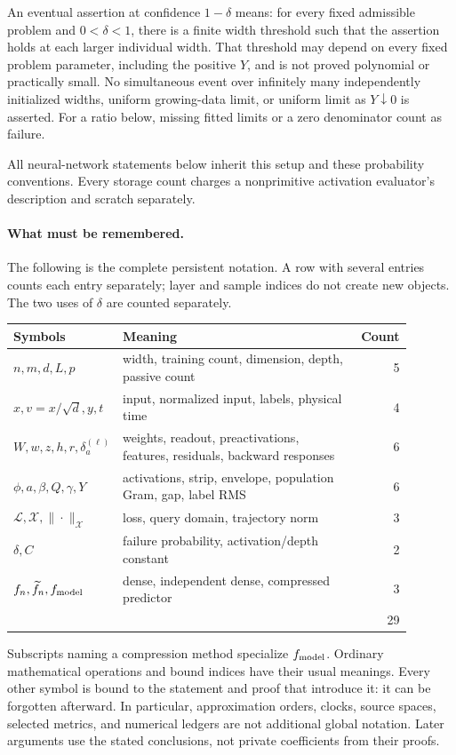 \documentclass[11pt]{article}
\theoremstyle{definition}
\theoremstyle{remark}
\newcommand{\cL}{\mathcal L}
\begin{document}
An eventual assertion at confidence $1-\delta$ means: for every fixed
admissible problem and $0<\delta<1$, there is a finite width threshold such
that the assertion holds at each larger individual width. That threshold
may depend on every fixed problem parameter, including the positive $Y$,
and is not proved polynomial or practically small. No simultaneous event
over infinitely many independently initialized widths, uniform growing-data
limit, or uniform limit as $Y\downarrow0$ is asserted. For a ratio below,
missing fitted limits or a zero denominator count as failure.

All neural-network statements below inherit this setup and these probability
conventions. Every storage count charges a nonprimitive activation evaluator's
description and scratch separately.

\paragraph{What must be remembered.}
The following is the complete persistent notation. A row with several entries
counts each entry separately; layer and sample indices do not create new
objects. The two uses of $\delta$ are counted separately.
\begin{center}\small
\begin{tabular}{@{}p{0.24\linewidth}p{0.65\linewidth}r@{}}
\toprule
Symbols&Meaning&Count\\
\midrule
$n,m,d,L,p$&width, training count, dimension, depth, passive count&5\\
$x,v=x/\sqrt d,y,t$&input, normalized input, labels, physical time&4\\
$W,w,z,h,r,\delta_a^{(\ell)}$&weights, readout, preactivations, features,
 residuals, backward responses&6\\
$\phi,a,\beta,Q,\gamma,Y$&activations, strip, envelope, population Gram,
 gap, label RMS&6\\
$\cL,\mathcal X,\|\cdot\|_{\mathcal X}$&loss, query domain, trajectory norm&3\\
$\delta,C$&failure probability, activation/depth constant&2\\
$f_n,\widetilde f_n,f_{\rm model}$&dense, independent dense, compressed predictor&3\\
\midrule
&&29\\
\bottomrule
\end{tabular}
\end{center}
Subscripts naming a compression method specialize $f_{\rm model}$. Ordinary
mathematical operations and bound indices have their usual meanings.
Every other symbol is bound to the statement and proof that introduce it:
it can be forgotten afterward. In particular, approximation orders, clocks,
source spaces, selected metrics, and numerical ledgers are not additional
global notation. Later arguments use the stated conclusions, not private
coefficients from their proofs.
\end{document}

